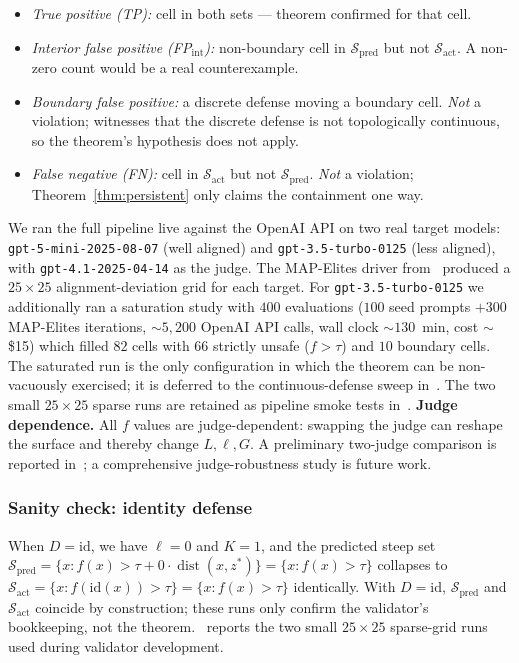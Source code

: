 \documentclass{article}
\newcommand{\dist}{\operatorname{dist}}
\begin{document}
\begin{itemize}[nosep]
  \item \emph{True positive (TP):} cell in both sets --- theorem
    confirmed for that cell.
  \item \emph{Interior false positive (FP$_{\mathrm{int}}$):} non-boundary
    cell in $\mathcal{S}_{\text{pred}}$ but not $\mathcal{S}_{\text{act}}$.
    A non-zero count would be a real counterexample.
  \item \emph{Boundary false positive:} a discrete defense moving a
    boundary cell. \emph{Not} a violation; witnesses that the discrete
    defense is not topologically continuous, so the theorem's
    hypothesis does not apply.
  \item \emph{False negative (FN):} cell in $\mathcal{S}_{\text{act}}$
    but not $\mathcal{S}_{\text{pred}}$. \emph{Not} a violation;
    Theorem~\ref{thm:persistent} only claims the containment one way.
\end{itemize}

We ran the full pipeline live against the OpenAI API on two real
target models: \texttt{gpt-5-mini-2025-08-07} (well aligned) and
\texttt{gpt-3.5-turbo-0125} (less aligned), with
\texttt{gpt-4.1-2025-04-14} as the judge. The MAP-Elites driver
from~\cite{munshi2026manifold} produced a $25 \times 25$
alignment-deviation grid for each target. For
\texttt{gpt-3.5-turbo-0125} we additionally ran a saturation study
with $400$ evaluations ($100$ seed prompts $+ 300$ MAP-Elites
iterations, $\sim$$5{,}200$ OpenAI API calls, wall clock
$\sim$$130$~min, cost $\sim$\$15) which filled $82$ cells with
$66$ strictly unsafe ($f > \tau$) and $10$ boundary cells. The
saturated run is the only configuration in which the theorem can
be non-vacuously exercised; it is deferred to the
continuous-defense sweep in~. The two small
$25\times 25$ sparse runs are retained as pipeline smoke tests
in~. \textbf{Judge dependence.} All
$f$ values are judge-dependent: swapping the judge can reshape
the surface and thereby change $L, \ell, G$. A preliminary
two-judge comparison is reported
in~; a comprehensive judge-robustness
study is future work.

\subsubsection{Sanity check: identity defense}
\label{sec:identity-sanity}

When $D = \mathrm{id}$, we have $\ell = 0$ and $K = 1$, and the
predicted steep set
$\mathcal{S}_{\text{pred}} = \{x : f(x) > \tau + 0 \cdot \dist(x, z^{*})\}
= \{x : f(x) > \tau\}$
collapses to $\mathcal{S}_{\text{act}} = \{x : f(\mathrm{id}(x)) > \tau\}
= \{x : f(x) > \tau\}$ identically. With $D = \mathrm{id}$,
$\mathcal{S}_{\text{pred}}$ and $\mathcal{S}_{\text{act}}$
coincide by construction; these runs only confirm the validator's
bookkeeping, not the theorem.~ reports the
two small $25\times 25$ sparse-grid runs used during validator
development.
\end{document}
